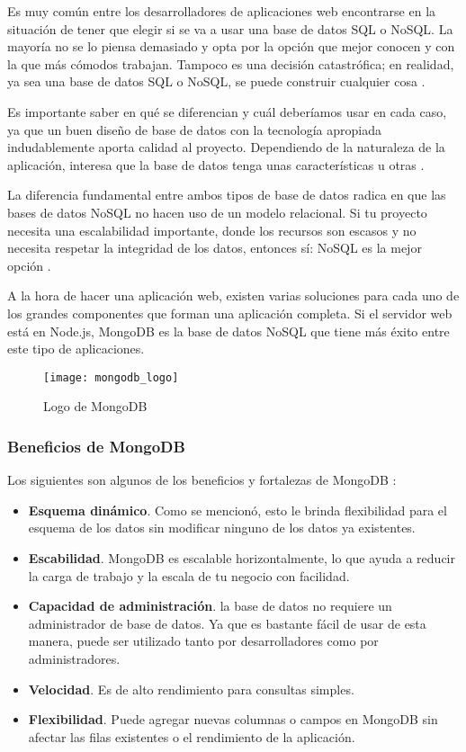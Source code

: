 Es muy común entre los desarrolladores de aplicaciones web encontrarse en la situación de tener que elegir si se va a usar una base de datos SQL o NoSQL. La mayoría no se lo piensa demasiado y opta por la opción que mejor conocen y con la que más cómodos trabajan. Tampoco es una decisión catastrófica; en realidad, ya sea una base de datos SQL o NoSQL, se puede construir cualquier cosa \cite{bd3}.

Es importante saber en qué se diferencian y cuál deberíamos usar en cada caso, ya que un buen diseño de base de datos con la tecnología apropiada indudablemente aporta calidad al proyecto. Dependiendo de la naturaleza de la aplicación, interesa que la base de datos tenga unas características u otras \cite{bd3}.

La diferencia fundamental entre ambos tipos de base de datos radica en que las bases de datos NoSQL no hacen uso de un modelo relacional. Si tu proyecto necesita una escalabilidad importante, donde los recursos son escasos y no necesita respetar la integridad de los datos, entonces sí: NoSQL es la mejor opción \cite{bd4}.

A la hora de hacer una aplicación web, existen varias soluciones para cada uno de los grandes componentes que forman una aplicación completa. Si el servidor web está en Node.js, MongoDB es la base de datos NoSQL que tiene más éxito entre este tipo de aplicaciones.

\begin{figure}[htp!]
  \centering
  \texttt{[image: mongodb\_logo]}
  \caption{Logo de MongoDB}
  \label{fig:mongodb_logo}
\end{figure}

\subsubsection{Beneficios de MongoDB}

Los siguientes son algunos de los beneficios y fortalezas de MongoDB \cite{bd7}:

\begin{itemize}
  \item \textbf{Esquema dinámico}. Como se mencionó, esto le brinda flexibilidad para el esquema de los datos sin modificar ninguno de los datos ya existentes.
  \item \textbf{Escabilidad}. MongoDB es escalable horizontalmente, lo que ayuda a reducir la carga de trabajo y la escala de tu negocio con facilidad.
  \item \textbf{Capacidad de administración}. la base de datos no requiere un administrador de base de datos. Ya que es bastante fácil de usar de esta manera, puede ser utilizado tanto por desarrolladores como por administradores.
  \item \textbf{Velocidad}. Es de alto rendimiento para consultas simples.
  \item \textbf{Flexibilidad}. Puede agregar nuevas columnas o campos en MongoDB sin afectar las filas existentes o el rendimiento de la aplicación.
\end{itemize}

